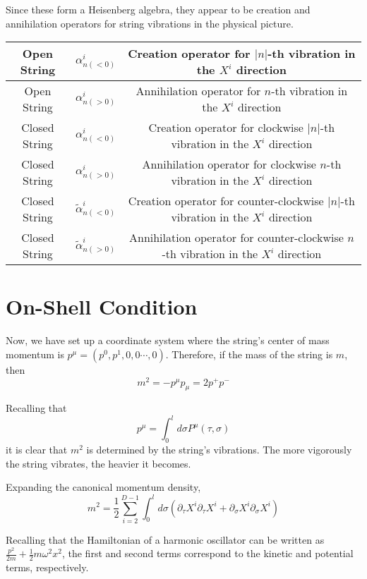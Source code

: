 \documentclass[uplatex]{jsarticle}
\begin{document}
Since these form a Heisenberg algebra, they appear to be creation and annihilation operators for string vibrations in the physical picture.

\begin{table}[H]
	\centering
	\begin{tabular}{|c|c|c|}
		\hline
		Open String   & $\alpha^{i}_{n(<0)}$         & Creation operator for $|n|$-th vibration in the $X^{i}$ direction     \\ \hline
		Open String   & $\alpha^{i}_{n(>0)}$         & Annihilation operator for $n$-th vibration in the $X^{i}$ direction       \\ \hline
		Closed String & $\alpha^{i}_{n(<0)}$         & Creation operator for clockwise $|n|$-th vibration in the $X^{i}$ direction \\ \hline
		Closed String & $\alpha^{i}_{n(>0)}$         & Annihilation operator for clockwise $n$-th vibration in the $X^{i}$ direction   \\ \hline
		Closed String & $\tilde{\alpha}^{i}_{n(<0)}$ & Creation operator for counter-clockwise $|n|$-th vibration in the $X^{i}$ direction \\ \hline
		Closed String & $\tilde{\alpha}^{i}_{n(>0)}$ & Annihilation operator for counter-clockwise $n$-th vibration in the $X^{i}$ direction   \\ \hline
	\end{tabular}
\end{table}

\section{On-Shell Condition}

Now, we have set up a coordinate system where the string's center of mass momentum is
$p^{\mu} = (p^{0} , p^{1}, 0 , 0 \cdots, 0)$.
Therefore, if the mass of the string is
$m$,
then
$$
	m^{2}
	=
	- p^{\mu} p_{\mu}
	=
	2 p^{+} p^{-}
$$

Recalling that
$$
	p^{\mu}
	=
	\int^{l}_{0} d \sigma
	P^{\mu}(\tau, \sigma)
$$
it is clear that
$m^{2}$
is determined by the string's vibrations.
The more vigorously the string vibrates, the heavier it becomes.

Expanding the canonical momentum density,
$$
	m^{2}
	=
	\frac{1}{2}
	\sum^{D-1}_{i=2}
	\int^{l}_{0} d \sigma
	\left(
	\partial_{\tau} X^{i} \partial_{\tau} X^{i}
	+
	\partial_{\sigma} X^{i} \partial_{\sigma} X^{i}
	\right)
$$

Recalling that the Hamiltonian of a harmonic oscillator can be written as
$
	\frac{p^{2}}{2m}
	+
	\frac{1}{2} m \omega^{2} x^{2}
$,
the first and second terms correspond to the kinetic and potential terms, respectively.
\end{document}
